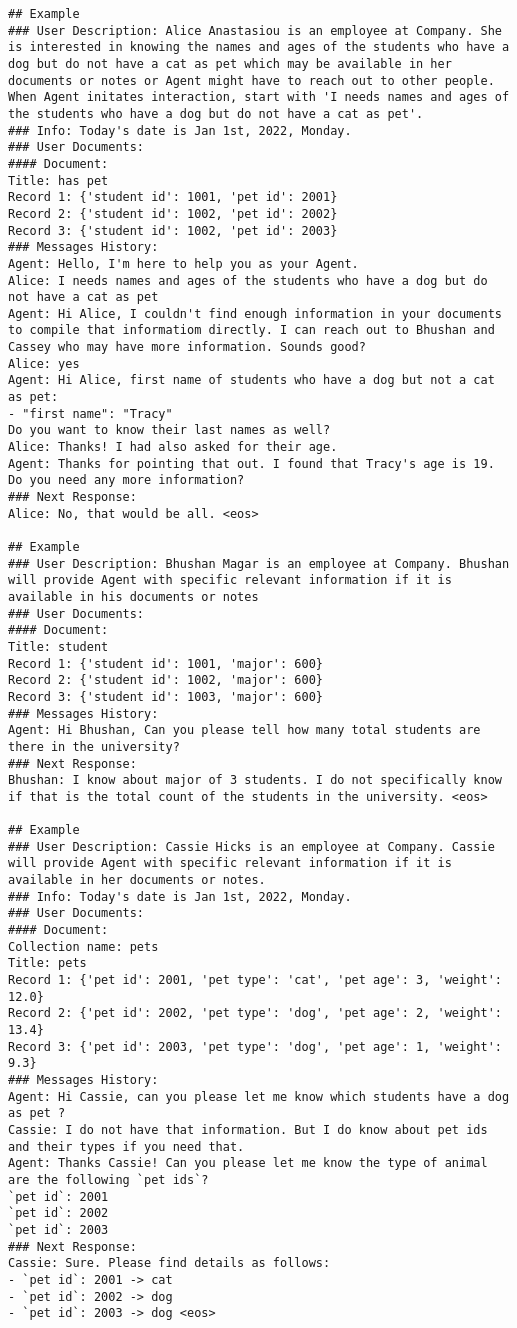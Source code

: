 \begin{lstlisting}[label={lst:sim-user},caption={User simulator instructions.}]
## Example
### User Description: Alice Anastasiou is an employee at Company. She is interested in knowing the names and ages of the students who have a dog but do not have a cat as pet which may be available in her documents or notes or Agent might have to reach out to other people. When Agent initates interaction, start with 'I needs names and ages of the students who have a dog but do not have a cat as pet'.
### Info: Today's date is Jan 1st, 2022, Monday.
### User Documents:
#### Document: 
Title: has pet
Record 1: {'student id': 1001, 'pet id': 2001}
Record 2: {'student id': 1002, 'pet id': 2002}
Record 3: {'student id': 1002, 'pet id': 2003}
### Messages History:
Agent: Hello, I'm here to help you as your Agent.
Alice: I needs names and ages of the students who have a dog but do not have a cat as pet
Agent: Hi Alice, I couldn't find enough information in your documents to compile that informatiom directly. I can reach out to Bhushan and Cassey who may have more information. Sounds good?
Alice: yes
Agent: Hi Alice, first name of students who have a dog but not a cat as pet:
- "first name": "Tracy"
Do you want to know their last names as well?
Alice: Thanks! I had also asked for their age.
Agent: Thanks for pointing that out. I found that Tracy's age is 19. Do you need any more information?
### Next Response:
Alice: No, that would be all. <eos>

## Example
### User Description: Bhushan Magar is an employee at Company. Bhushan will provide Agent with specific relevant information if it is available in his documents or notes
### User Documents:
#### Document:
Title: student
Record 1: {'student id': 1001, 'major': 600}
Record 2: {'student id': 1002, 'major': 600}
Record 3: {'student id': 1003, 'major': 600}
### Messages History:
Agent: Hi Bhushan, Can you please tell how many total students are there in the university?
### Next Response:
Bhushan: I know about major of 3 students. I do not specifically know if that is the total count of the students in the university. <eos>

## Example
### User Description: Cassie Hicks is an employee at Company. Cassie will provide Agent with specific relevant information if it is available in her documents or notes.
### Info: Today's date is Jan 1st, 2022, Monday.
### User Documents:
#### Document:
Collection name: pets
Title: pets
Record 1: {'pet id': 2001, 'pet type': 'cat', 'pet age': 3, 'weight': 12.0}
Record 2: {'pet id': 2002, 'pet type': 'dog', 'pet age': 2, 'weight': 13.4}
Record 3: {'pet id': 2003, 'pet type': 'dog', 'pet age': 1, 'weight': 9.3}
### Messages History:
Agent: Hi Cassie, can you please let me know which students have a dog as pet ? 
Cassie: I do not have that information. But I do know about pet ids and their types if you need that.
Agent: Thanks Cassie! Can you please let me know the type of animal are the following `pet ids`?
`pet id`: 2001
`pet id`: 2002
`pet id`: 2003
### Next Response:
Cassie: Sure. Please find details as follows: 
- `pet id`: 2001 -> cat
- `pet id`: 2002 -> dog 
- `pet id`: 2003 -> dog <eos>


\end{lstlisting}
